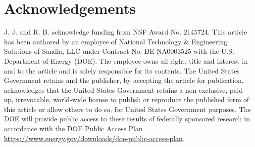 \section{Acknowledgements}

J. J. and R. B. acknowledge funding from NSF Award No. 2145724. This article has been authored by an employee of National Technology \& Engineering Solutions of Sandia, LLC under Contract No. DE-NA0003525 with the U.S. Department of Energy (DOE). The employee owns all right, title and interest in and to the article and is solely responsible for its contents. The United States Government retains and the publisher, by accepting the article for publication, acknowledges that the United States Government retains a non-exclusive, paid-up, irrevocable, world-wide license to publish or reproduce the published form of this article or allow others to do so, for United States Government purposes. The DOE will provide public access to these results of federally sponsored research in accordance with the DOE Public Access Plan \url{https://www.energy.gov/downloads/doe-public-access-plan}.
